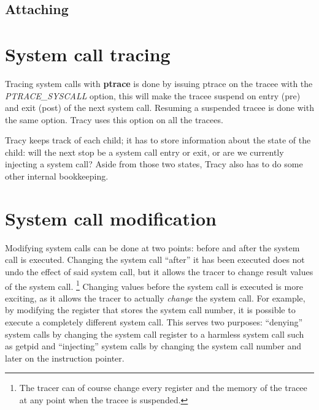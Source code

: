 \documentclass[a4paper, 10pt]{report}
\begin{document}
\subsection{Attaching}

%

\section{System call tracing}
\label{syscall-trace}

Tracing system calls with \textbf{ptrace} is done by issuing ptrace on the
tracee with the \textit{PTRACE\_SYSCALL} option, this will make the tracee
suspend on entry (pre) and exit (post) of the next system call. Resuming a
suspended tracee is done with the same option. Tracy uses this option on
all the tracees.

Tracy keeps track of each child; it has to store information about the state
of the child: will the next stop be a system call entry or exit, or are we
currently injecting a system call? Aside from those two states, Tracy also
has to do some other internal bookkeeping.


\section{System call modification}

Modifying system calls can be done at two points: before and after the
system call is executed. Changing the system call ``after'' it has been executed
does not undo the effect of said system call, but it allows the tracer to change
result values of the system call.
\footnote{The tracer can of course change every register and the memory of the
tracee at any point when the tracee is suspended.}
Changing values before the system call is executed is more exciting, as it
allows the tracer to actually \textit{change} the system call. For example, by
modifying the register that stores the system call number, it is possible to
execute a completely different system call. This serves two purposes:
``denying'' system calls by changing the system call register to a harmless
system call such as getpid and ``injecting'' system calls by changing the
system call number and later on the instruction pointer.
\end{document}
